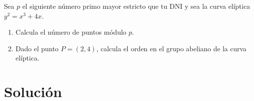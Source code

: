 	Sea $p$ el siguiente número primo mayor estricto que tu DNI y sea la curva elíptica $y^2 = x^3 + 4x$.
	\begin{enumerate}
		\item Calcula el número de puntos módulo $p$.
		\item Dado el punto $P = (2,4)$, calcula el orden en el grupo abeliano de la curva elíptica.
	\end{enumerate}
	
\section*{Solución}
